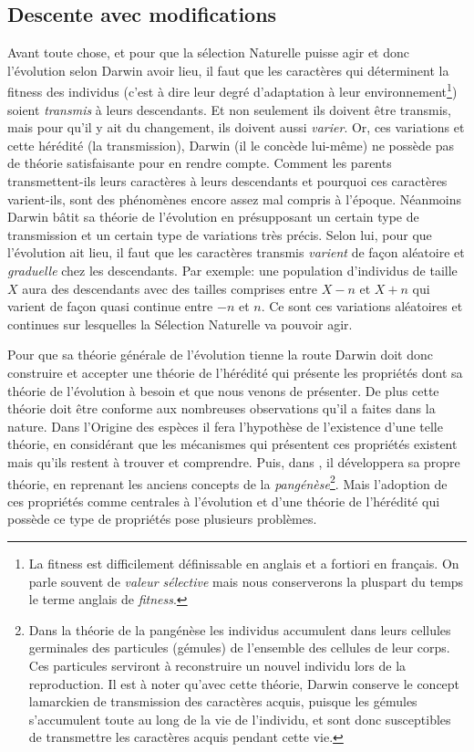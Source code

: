 \subsection{Descente avec modifications}\label{sec:hered}
Avant toute chose, et pour que la sélection Naturelle puisse agir et donc l'évolution selon Darwin avoir lieu, il faut que les caractères qui déterminent la fitness des individus (c'est à dire leur degré d'adaptation à leur environnement\footnote{La fitness est difficilement définissable en anglais et a fortiori en français. On parle souvent de \emph{valeur sélective} mais nous conserverons la pluspart du temps le terme anglais de \emph{fitness}.}) soient \emph{transmis} à leurs descendants. Et non seulement ils doivent être transmis, mais pour qu'il y ait du changement, ils doivent aussi \emph{varier}. Or, ces variations et cette hérédité (la transmission), Darwin (il le concède lui-même) ne possède pas de théorie satisfaisante pour en rendre compte. Comment les parents transmettent-ils leurs caractères à leurs descendants et pourquoi ces caractères varient-ils, sont des phénomènes encore assez mal compris à l'époque. Néanmoins Darwin bâtit sa théorie de l'évolution en présupposant un certain type de transmission et un certain type de variations très précis. Selon lui, pour que l'évolution ait lieu, il faut que les caractères transmis \emph{varient} de façon aléatoire et \emph{graduelle} chez les descendants. Par exemple: une population d'individus de taille $X$ aura des descendants avec des tailles comprises entre $X-n$ et $X+n$ qui varient de façon quasi continue entre $-n$ et $n$. Ce sont ces variations aléatoires et continues sur lesquelles la Sélection Naturelle va pouvoir agir.

Pour que sa théorie générale de l'évolution tienne la route Darwin doit donc construire et accepter une théorie de l'hérédité qui présente les propriétés dont sa théorie de l'évolution à besoin et que nous venons de présenter. De plus cette théorie doit être conforme aux nombreuses observations qu'il a faites dans la nature. Dans l'Origine des espèces il fera l'hypothèse de l'existence d'une telle théorie, en considérant que les mécanismes qui présentent ces propriétés existent mais qu'ils restent à trouver et comprendre. Puis, dans \cite{darwin1868variation}, il développera sa propre théorie, en reprenant les anciens concepts de la \emph{pangénèse}\footnote{Dans la théorie de la pangénèse les individus accumulent dans leurs cellules germinales des particules (gémules) de l'ensemble des cellules de leur corps. Ces particules serviront à reconstruire un nouvel individu lors de la reproduction. Il est à noter qu'avec cette théorie, Darwin conserve le concept lamarckien de transmission des caractères acquis, puisque les gémules s'accumulent toute au long de la vie de l'individu, et sont donc susceptibles de transmettre les caractères acquis pendant cette vie.}. Mais l'adoption de ces propriétés comme centrales à l'évolution et d'une théorie de l'hérédité qui possède ce type de propriétés pose plusieurs problèmes.

